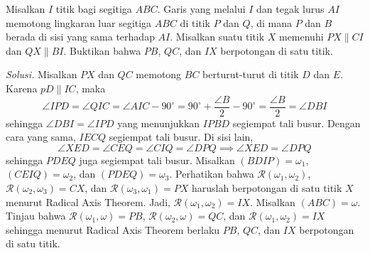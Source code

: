 \documentclass[a4paper, 11pt]{article}
\newcommand{\siku}[4][.21cm]
	{
	\coordinate (tempa) at ($(#3)!#1!(#2)$);
	\coordinate (tempb) at ($(#3)!#1!(#4)$);
	\coordinate (tempc) at ($(tempa)!0.5!(tempb)$);%
	\draw[black] (tempa) -- ($(#3)!2!(tempc)$) -- (tempb);
	}
\begin{document}
\newpage
\begin{tcolorbox}[title=\textbf{Soal 9: PUMaC 2017/3}]
Misalkan $I$ titik bagi segitiga $ABC$. Garis yang melalui $I$ dan tegak lurus $AI$ memotong lingkaran luar segitiga $ABC$ di titik $P$ dan $Q$, di mana $P$ dan $B$ berada di sisi yang sama terhadap $AI$. Misalkan suatu titik $X$ memenuhi $PX\parallel CI$ dan $QX\parallel BI$. Buktikan bahwa $PB$, $QC$, dan $IX$ berpotongan di satu titik.
\end{tcolorbox}
\noindent\textit{Solusi.} Misalkan $PX$ dan $QC$ memotong $BC$ berturut-turut di titik $D$ dan $E$. Karena $pD\parallel IC$, maka
\[\angle IPD = \angle QIC = \angle AIC - 90^\circ = 90^\circ +\frac{\angle B}{2} -90^\circ = \frac{\angle B}{2} = \angle DBI\]
sehingga $\angle DBI=\angle IPD$ yang menunjukkan $IPBD$ segiempat tali busur. Dengan cara yang sama, $IECQ$ segiempat tali busur. Di sisi lain,
\[\angle XED = \angle CEQ = \angle CIQ= \angle DPQ \implies \angle XED = \angle DPQ\]
sehingga $PDEQ$ juga segiempat tali busur. Misalkan $(BDIP)=\omega_1$, $(CEIQ)=\omega_2$, dan $(PDEQ)=\omega_3$. Perhatikan bahwa $\mathcal{R}(\omega_1,\omega_2)$, $\mathcal{R}(\omega_2,\omega_3) = CX$, dan $\mathcal{R}(\omega_3,\omega_1)=PX$ haruslah berpotongan di satu titik $X$ menurut Radical Axis Theorem. Jadi, $\mathcal{R}(\omega_1,\omega_2)= IX$. Misalkan $(ABC)=\omega$. Tinjau bahwa $\mathcal{R}(\omega_1,\omega)=PB$, $\mathcal{R}(\omega_2,\omega)=QC$, dan $\mathcal{R}(\omega_1,\omega_2)=IX$ sehingga menurut Radical Axis Theorem berlaku $PB$, $QC$, dan $IX$ berpotongan di satu titik.
\begin{center}
\end{center}
\end{document}
